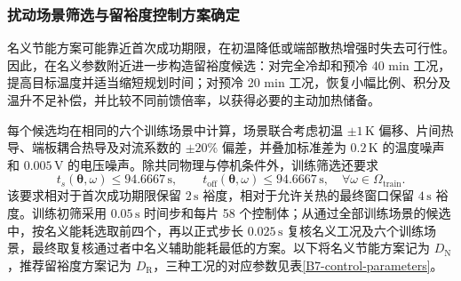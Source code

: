 \subsubsection{扰动场景筛选与留裕度控制方案确定}
名义节能方案可能靠近首次成功期限，在初温降低或端部散热增强时失去可行性。因此，在名义参数附近进一步构造留裕度候选：对完全冷却和预冷 40 min 工况，提高目标温度并适当缩短规划时间；对预冷 20 min 工况，恢复小幅比例、积分及温升不足补偿，并比较不同前馈倍率，以获得必要的主动加热储备。

每个候选均在相同的六个训练场景中计算，场景联合考虑初温 \(\pm1\,\mathrm K\) 偏移、片间热导、端板耦合热导及对流系数的 \(\pm20\%\) 偏差，并叠加标准差为 \(0.2\,\mathrm K\) 的温度噪声和 \(0.005\,\mathrm V\) 的电压噪声。除共同物理与停机条件外，训练筛选还要求
\begin{equation}
t_s(\boldsymbol\theta,\omega)\leq94.6667\,\mathrm s,\qquad
t_{\mathrm{off}}(\boldsymbol\theta,\omega)\leq94.6667\,\mathrm s,
\quad \forall\omega\in\Omega_{\mathrm{train}}.
\tag{7-@@8@@}\label{eq:q4:solver_training_deadline}
\end{equation}
该要求相对于首次成功期限保留 \(2\,\mathrm s\) 裕度，相对于允许关热的最终窗口保留 \(4\,\mathrm s\) 裕度。训练初筛采用 \(0.05\,\mathrm s\) 时间步和每片 58 个控制体；从通过全部训练场景的候选中，按名义能耗选取前四个，再以正式步长 \(0.025\,\mathrm s\) 复核名义工况及六个训练场景，最终取复核通过者中名义辅助能耗最低的方案。以下将名义节能方案记为 \(D_{\mathrm N}\)，推荐留裕度方案记为 \(D_{\mathrm R}\)，三种工况的对应参数见表\ref{B7-control-parameters}。

\begin{table}[htbp]
    \centering
    \caption{三种预冷工况的名义节能与推荐留裕度控制参数}
    \label{B7-control-parameters}
    \renewcommand{\arraystretch}{1.5}
\end{table}

